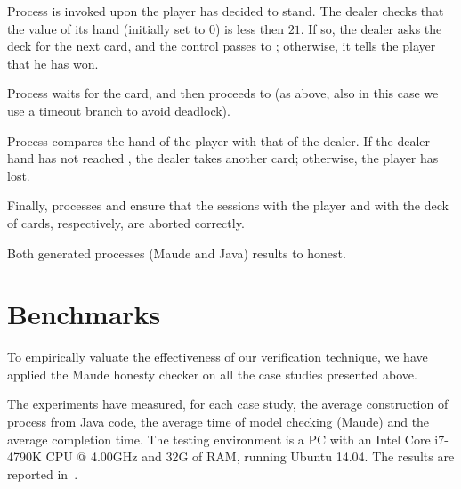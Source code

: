 
Process  is invoked upon the player
has decided to stand.
The dealer checks that the value  of its hand 
(initially set to $0$) is less then $21$.
If so, the dealer asks the deck for the next card,
and the control passes to ;
otherwise, it tells the player that he has won.


Process  waits for the card, and then proceeds
to 
(as above, also in this case we use a timeout branch to avoid deadlock).


Process  compares the hand  of the player 
with that  of the dealer. 
If the dealer hand has not reached , the dealer takes another card;
otherwise, the player has lost.


Finally, processes  and  
ensure that the sessions with the player and with the deck of cards,
respectively, are aborted correctly.

Both generated processes (Maude and Java) results to honest.

\section{Benchmarks}
To empirically valuate the effectiveness of our verification technique,
we have applied the Maude honesty checker on all the case studies 
presented above.

The experiments have measured, for each case study, 
the average construction of \coco process from Java code,
the average time of model checking (Maude) and the average completion time. %
The testing environment is a PC with an Intel Core i7-4790K CPU @ 4.00GHz 
and 32G of RAM, running Ubuntu 14.04. %
The results are reported in~.


